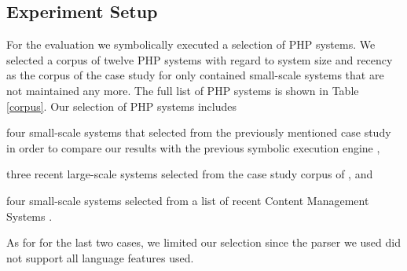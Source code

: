 \documentclass[preprint]{sig-alternate-05-2015}
\begin{document}
\subsection{Experiment Setup} 
For the evaluation we symbolically executed a selection of PHP systems. We selected a corpus of twelve PHP systems with regard to system size and recency as the corpus of the case study for \cite{Nguyen:2014:BCG:2635868.2635928} only contained small-scale systems that are not maintained any more. The full list of PHP systems is shown in Table \ref{corpus}. Our selection of PHP systems includes
\begin{compactitem}
\item four small-scale systems that selected from the previously mentioned case study in order to compare our results with the previous symbolic execution engine \cite{Nguyen:2014:BCG:2635868.2635928},
\item three recent large-scale systems selected from the case study corpus of \cite{Hills:2013:ESP:2483760.2483786}, and
\item four small-scale systems selected from a list of recent Content Management Systems \cite{codegeekz}.

\end{compactitem}
As for for the last two cases, we limited our selection since the parser we
used did not support all language features used.
\end{document}
